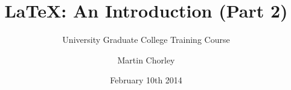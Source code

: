\documentclass{beamer}
\begin{document}
    \title[\LaTeX]{\LaTeX: An Introduction (Part 2)}
    \subtitle{University Graduate College Training Course}
    \author[MJC]{Martin Chorley}
    \date[Feb 2014]{February 10th 2014}

    \begin{frame}{}
        \titlepage
    \end{frame}
\end{document}
